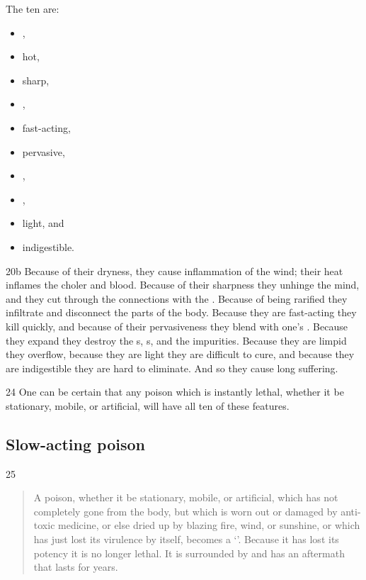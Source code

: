 \begin{translation}
    The ten are:
    \begin{itemize}
        \item    {}, 
        \item hot, 
        \item sharp, 
        \item {},
        \item     fast-acting, 
        \item pervasive, 
        \item {}, 
        \item {},
        \item     light, and 
        \item indigestible.    
    \end{itemize}
    \item[ 20b]
    Because of their dryness, they cause inflammation of the wind; their heat
    inflames the choler and blood. 
    Because of their sharpness they unhinge the
    mind, and they cut through the connections with the .  Because of being rarified they infiltrate and disconnect
    the parts of the body. Because they are fast-acting they kill quickly, and
    because of their pervasiveness they blend with one's .  Because they expand they destroy the
    s, s, and the
    impurities.  Because they are limpid they overflow,
    because they are light they are difficult to cure, and because they are
    indigestible they are hard to eliminate.  And so they cause long suffering.
    
    \item[ 24]
    One can be certain that any poison which is instantly lethal, whether it be
    stationary, mobile, or artificial, will have all ten of these features.
    
    \subsection{Slow-acting poison}
    \item[25]  
    \begin{verse}
        A poison, whether it be stationary, mobile, or artificial, which has not
        completely gone from the body, but which is worn out or damaged by
        anti-toxic medicine, or else dried up by blazing fire, wind, or sunshine, or
        which has just lost its virulence by itself, becomes a `'\label{dusivisa}.  Because it has lost its potency it is
        no longer lethal.  It is surrounded by  and has an
        aftermath that lasts for years.
        

\end{verse}
\end{translation}
